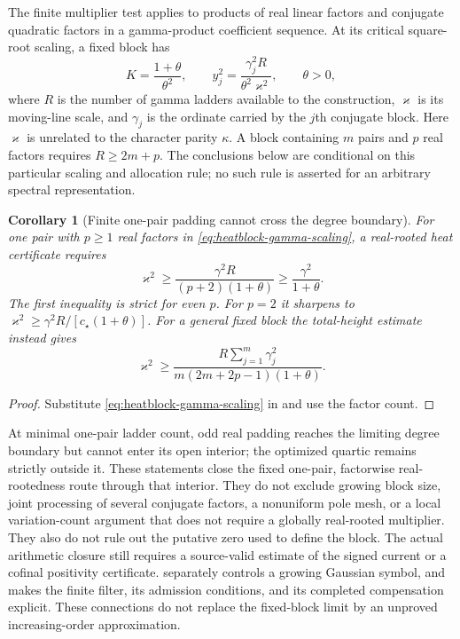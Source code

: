 \documentclass[11pt]{article}
\newtheorem{corollary}[theorem]{Corollary}
\theoremstyle{definition}
\theoremstyle{remark}
\begin{document}
The finite multiplier test applies to products of real linear factors
and conjugate quadratic factors in a gamma-product coefficient
sequence.  At its critical square-root scaling, a fixed block has
\begin{equation}
 K=\frac{1+\theta}{\theta^2},\qquad
 y_j^2=\frac{\gamma_j^2R}{\theta^2\varkappa^2},
 \qquad\theta>0,
 \label{eq:heatblock-gamma-scaling}
\end{equation}
where $R$ is the number of gamma ladders available to the construction,
$\varkappa$ is its moving-line scale, and $\gamma_j$ is the ordinate
carried by the $j$th conjugate block.  Here $\varkappa$ is unrelated
to the character parity $\kappa$.  A block containing $m$ pairs and
$p$ real factors requires $R\ge2m+p$.  The conclusions below are
conditional on this particular scaling and allocation rule; no such
rule is asserted for an arbitrary spectral representation.

\begin{corollary}[Finite one-pair padding cannot cross the degree boundary]
\label{cor:heatblock-gamma-onepair}
For one pair with $p\ge1$ real factors in
\eqref{eq:heatblock-gamma-scaling}, a real-rooted heat certificate
requires
\begin{equation}
 \varkappa^2\ge
 \frac{\gamma^2R}{(p+2)(1+\theta)}
 \ge\frac{\gamma^2}{1+\theta}.
 \label{eq:heatblock-gamma-onepair}
\end{equation}
The first inequality is strict for even $p$.  For $p=2$ it sharpens
to $\varkappa^2\ge\gamma^2R/[c_\star(1+\theta)]$.
For a general fixed block the total-height estimate instead gives
\begin{equation}
 \varkappa^2\ge
 \frac{R\sum_{j=1}^m\gamma_j^2}
 {m(2m+2p-1)(1+\theta)}.
 \label{eq:heatblock-gamma-total}
\end{equation}
\end{corollary}

\begin{proof}
Substitute \eqref{eq:heatblock-gamma-scaling} in
and use the factor count.
\end{proof}

At minimal one-pair ladder count, odd real padding reaches the limiting
degree boundary but cannot enter its open interior; the optimized
quartic remains strictly outside it.  These statements close the
fixed one-pair, factorwise real-rootedness route through that interior.
They do not exclude growing block size, joint processing of several
conjugate factors, a nonuniform pole mesh, or a local variation-count
argument that does not require a globally real-rooted multiplier.
They also do not rule out the putative zero used to define the block.
The actual arithmetic closure still requires a source-valid estimate
of the signed current or a cofinal positivity certificate.
 separately controls a growing
Gaussian symbol, and  makes the
finite filter, its admission conditions, and its completed compensation
explicit.  These connections do not replace the fixed-block limit by an
unproved increasing-order approximation.
\end{document}
